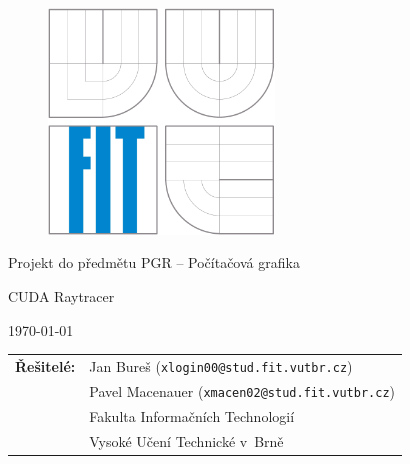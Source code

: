 \begin{titlepage}

\vspace*{1cm}

\begin{figure}
  \centering
  \includegraphics[height=6cm]{images/fit.pdf}
\end{figure}

\vspace*{5mm}

\begin{center}
\begin{Large}
Projekt do předmětu PGR -- Počítačová grafika
\end{Large}
\end{center}

\vspace*{5mm}

\begin{center}
\begin{Huge}
CUDA Raytracer \\
\end{Huge}
\end{center}

\vspace*{1cm}

\begin{center}
\begin{Large}
\today
\end{Large}
\end{center}

\vfill

\begin{flushleft}
\begin{large}
\begin{tabular}{ll}

\bf Řešitelé:\hspace{3mm}
& Jan Bureš (\verb_xlogin00@stud.fit.vutbr.cz_) \\
& Pavel Macenauer (\verb_xmacen02@stud.fit.vutbr.cz_) \\
& Fakulta Informačních Technologií \\
& Vysoké Učení Technické v~Brně

\end{tabular}
\end{large}
\end{flushleft}

\end{titlepage}

